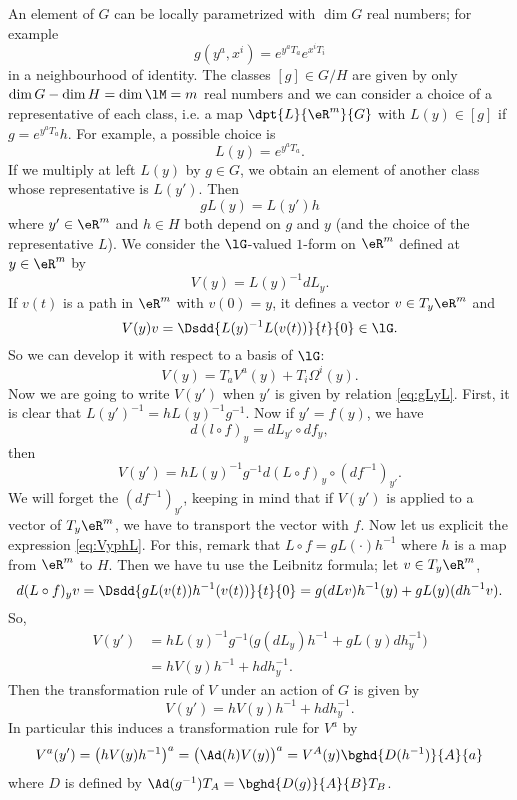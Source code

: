 An element of $G$ can be locally parametrized with $\dim G$ real numbers; for example
\[
   g(y^a,x^i)=e^{y^aT_a}e^{x^iT_i}
\]
in a neighbourhood of identity. The classes $[g]\in G/H$ are given by only $\dim G-\dim H=\dim\lM=m$ real numbers and we can consider a choice of a representative of each class, i.e. a map $\dpt{L}{\eR^m}{G}$ with $L(y)\in[g]$ if $g=e^{y^aT_a}h$. For example, a possible choice is
\[
  L(y)=e^{y^aT_a}.
\]
If we multiply at left $L(y)$ by $g\in G$, we obtain an element of another class whose representative is $L(y')$. Then
\begin{equation}\label{eq:gLyL}
  gL(y)=L(y')h
\end{equation}
where $y'\in\eR^m$ and $h\in H$ both depend on $g$ and $y$ (and the choice of the representative $L$). We consider the $\lG$-valued $1$-form on $\eR^m$ defined at $y\in\eR^m$ by
\begin{equation}
    V(y)=L(y)^{-1} dL_y.
\end{equation}
If $v(t)$ is a path in $\eR^m$ with $v(0)=y$, it defines a vector $v\in T_y\eR^m$ and
\[
  V(y)v=\Dsdd{ L(y)^{-1} L(v(t)) }{t}{0}\in\lG.
\]
So we can develop it with respect to a basis of $\lG$:
\[
   V(y)=T_aV^a(y)+T_i\Omega^i(y).
\]
Now we are going to write $V(y')$ when $y'$ is given by relation \eqref{eq:gLyL}. First, it is clear that $L(y')^{-1}=hL(y)^{-1} g^{-1}$. Now if $y'=f(y)$, we have
\[
   d(l\circ f)_y=dL_{y'}\circ df_y,
\]
then
\begin{equation}\label{eq:VyphL}
V(y')=hL(y)^{-1} g^{-1} d(L\circ f)_y\circ(df^{-1})_{y'}.
\end{equation}
We will forget the $(df^{-1})_{y'}$, keeping in mind that if $V(y')$ is applied to a vector of $T_y\eR^m$, we have to transport the vector with $f$. Now let us explicit the expression \eqref{eq:VyphL}. For this, remark that $L\circ f=gL(\cdot)h^{-1}$ where $h$ is a map from $\eR^m$ to $H$. Then we have tu use the Leibnitz formula; let $v\in T_y\eR^m$,
\begin{equation}
  d(L\circ f)_yv=\Dsdd{ gL(v(t))h^{-1}(v(t)) }{t}{0}
                =g(dLv)h^{-1}(y)+gL(y)(dh^{-1} v).
\end{equation}
So,
\begin{equation}
\begin{split}
   V(y')&=hL(y)^{-1} g^{-1}\big(  g(dL_y) h^{-1}+gL(y)dh^{-1}_y   \big)\\
        &=h V(y)h^{-1}+hdh^{-1}_y.
\end{split}
\end{equation}
Then the transformation rule of $V$ under an action of $G$ is given by
\begin{equation}
    V(y')=hV(y)h^{-1}+hdh^{-1}_y.
\end{equation}
In particular this induces a transformation rule for $V^a$ by 
\begin{equation}\label{eq:trans_V}
V^a(y')=\big(  hV(y)h^{-1}  \big)^a=\big(\Ad(h)V(y)\big)^a=V^A(y)\bghd{D(h^{-1})}{A}{a}
\end{equation}
where $D$ is defined by $\Ad(g^{-1})T_A=\bghd{D(g)}{A}{B}T_B$.


